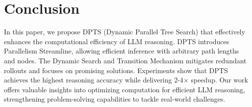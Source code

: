 \section{Conclusion}


In this paper, we propose DPTS (Dynamic Parallel Tree Search) that effectively enhances the computational efficiency of LLM reasoning. DPTS introduces Parallelism Streamline, allowing efficient inference with arbitrary path lengths and nodes. The Dynamic Search and Transition Mechanism mitigates redundant rollouts and focuses on promising solutions. Experiments show that DPTS achieves the highest reasoning accuracy while delivering 2-4$\times$ speedup. 
Our work offers valuable insights into optimizing computation for efficient LLM reasoning, strengthening problem-solving capabilities to tackle real-world challenges.
